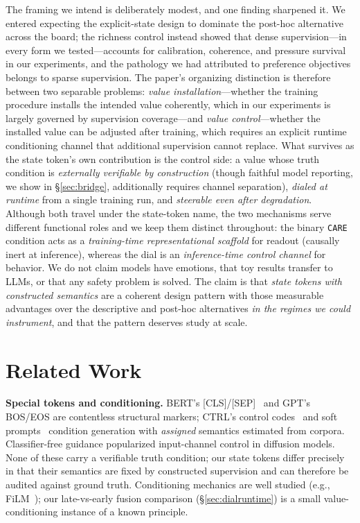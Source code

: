 \documentclass[11pt]{article}
\newcommand{\care}{\texttt{CARE}}
\begin{document}
The framing we intend is deliberately modest, and one finding sharpened it. We entered expecting the explicit-state design to dominate the post-hoc alternative across the board; the richness control instead showed that dense supervision---in every form we tested---accounts for calibration, coherence, and pressure survival in our experiments, and the pathology we had attributed to preference objectives belongs to sparse supervision. The paper's organizing distinction is therefore between two separable problems: \emph{value installation}---whether the training procedure installs the intended value coherently, which in our experiments is largely governed by supervision coverage---and \emph{value control}---whether the installed value can be adjusted after training, which requires an explicit runtime conditioning channel that additional supervision cannot replace. What survives as the state token's own contribution is the control side: a value whose truth condition is \emph{externally verifiable by construction} (though faithful model reporting, we show in \S\ref{sec:bridge}, additionally requires channel separation), \emph{dialed at runtime} from a single training run, and \emph{steerable even after degradation}. Although both travel under the state-token name, the two mechanisms serve different functional roles and we keep them distinct throughout: the binary \care{} condition acts as a \emph{training-time representational scaffold} for readout (causally inert at inference), whereas the dial is an \emph{inference-time control channel} for behavior. We do not claim models have emotions, that toy results transfer to LLMs, or that any safety problem is solved. The claim is that \emph{state tokens with constructed semantics} are a coherent design pattern with those measurable advantages over the descriptive and post-hoc alternatives \emph{in the regimes we could instrument}, and that the pattern deserves study at scale.

\section{Related Work}
\label{sec:related}

\textbf{Special tokens and conditioning.} BERT's [CLS]/[SEP]~\cite{devlin2019bert} and GPT's BOS/EOS are contentless structural markers; CTRL's control codes~\cite{keskar2019ctrl} and soft prompts~\cite{lester2021power} condition generation with \emph{assigned} semantics estimated from corpora. Classifier-free guidance popularized input-channel control in diffusion models. None of these carry a verifiable truth condition; our state tokens differ precisely in that their semantics are fixed by constructed supervision and can therefore be audited against ground truth. Conditioning mechanics are well studied (e.g., FiLM~\cite{perez2018film}); our late-vs-early fusion comparison (\S\ref{sec:dialruntime}) is a small value-conditioning instance of a known principle.
\end{document}
